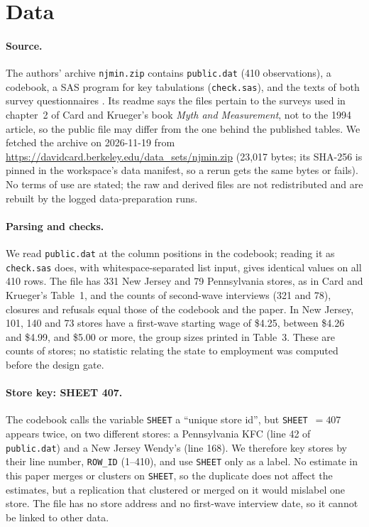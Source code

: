 \documentclass[11pt]{article}
\newcommand{\var}[1]{\texttt{#1}}
\begin{document}
\section{Data}
\label{sec:data}

\paragraph{Source.} The authors' archive \texttt{njmin.zip} contains \texttt{public.dat}
(410 observations), a codebook, a SAS program for key tabulations (\texttt{check.sas}), and
the texts of both survey questionnaires \citep{card_njmin_readme}. Its readme says the files
pertain to the surveys used in chapter~2 of Card and Krueger's book \emph{Myth and
Measurement}, not to the 1994 article, so the public file may differ from the one behind the
published tables. We fetched the archive on 2026-11-19 from
\url{https://davidcard.berkeley.edu/data_sets/njmin.zip} (23{,}017 bytes; its SHA-256 is
pinned in the workspace's data manifest, so a rerun gets the same bytes or fails). No terms
of use are stated; the raw and derived files are not redistributed and are rebuilt by the
logged data-preparation runs.

\paragraph{Parsing and checks.} We read \texttt{public.dat} at the column positions in the
codebook; reading it as \texttt{check.sas} does, with whitespace-separated list input, gives
identical values on all 410 rows. The file has 331 New Jersey and 79 Pennsylvania stores, as
in Card and Krueger's Table~1, and the counts of second-wave interviews (321 and 78),
closures and refusals equal those of the codebook and the paper. In New Jersey, 101, 140 and
73 stores have a first-wave starting wage of \$4.25, between \$4.26 and \$4.99, and \$5.00 or
more, the group sizes printed in Table~3. These are counts of stores; no statistic relating
the state to employment was computed before the design gate.

\paragraph{Store key: SHEET 407.} The codebook calls the variable \var{SHEET} a ``unique
store id'', but \var{SHEET}~$=407$ appears twice, on two different stores: a Pennsylvania KFC
(line 42 of \texttt{public.dat}) and a New Jersey Wendy's (line 168). We therefore key
stores by their line number, \var{ROW\_ID} (1--410), and use \var{SHEET} only as a label. No
estimate in this paper merges or clusters on \var{SHEET}, so the duplicate does not affect
the estimates, but a replication that clustered or merged on it would mislabel one store.
The file has no store address and no first-wave interview date, so it cannot be linked to
other data.
\end{document}
